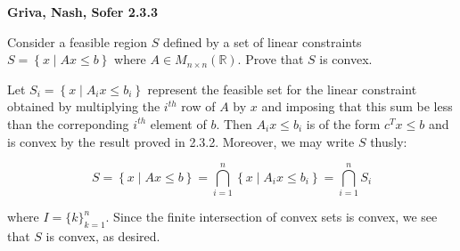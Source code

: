 \textbf{Griva, Nash, Sofer 2.3.3}

Consider a feasible region $S$ defined by a set of linear constraints 
$S = \left\{ x \mid Ax \le b \right\}$ where $A \in M_{n \times n}(\mathbb{R})$.
Prove that $S$ is convex.

\begin{solution}
  Let $S_i = \left\{ x \mid A_i x \le b_i \right\}$ represent the feasible set for the linear 
  constraint obtained by multiplying the $i^{th}$ row of $A$ by $x$ and imposing that this sum
  be less than the correponding $i^{th}$ element of $b$. Then $A_i x \le b_i$ is of the form 
  $c^T x \le b$ and is convex by the result proved in 2.3.2. Moreover, we may write $S$ thusly:
 
  $$
    S = \left\{ x \mid Ax \le b \right\} 
      = \bigcap_{i=1}^n{\left\{ x \mid A_i x \le b_i \right\}} 
      = \bigcap_{i=1}^n{S_i}
  $$

  where $I = \{ k \}_{k=1}^n$. Since the finite intersection of convex sets is convex, we see
  that $S$ is convex, as desired.
  \ \\
\end{solution}
